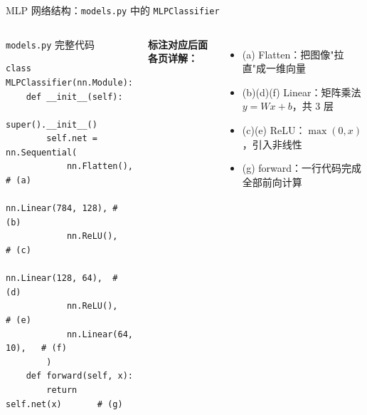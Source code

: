 \documentclass[aspectratio=169]{ctexbeamer}
\begin{document}
\begin{frame}[fragile,shrink=20]{MLP 网络结构：\texttt{models.py} 中的 \texttt{MLPClassifier}}
\begin{columns}[T]
\begin{block}{\texttt{models.py} 完整代码}
\footnotesize
\begin{lstlisting}[basicstyle=\ttfamily\scriptsize, frame=none, numbers=none, backgroundcolor=\color{codebg}]
class MLPClassifier(nn.Module):
    def __init__(self):
        super().__init__()
        self.net = nn.Sequential(
            nn.Flatten(),        # (a)
            nn.Linear(784, 128), # (b)
            nn.ReLU(),           # (c)
            nn.Linear(128, 64),  # (d)
            nn.ReLU(),           # (e)
            nn.Linear(64, 10),   # (f)
        )
    def forward(self, x):
        return self.net(x)       # (g)
\end{lstlisting}
\end{block}
\vspace{0.1cm}
\footnotesize
\textbf{标注对应后面各页详解：}
\begin{itemize}
  \item (a) Flatten：把图像"拉直"成一维向量
  \item (b)(d)(f) Linear：矩阵乘法 $y=Wx+b$，共 3 层
  \item (c)(e) ReLU：$\max(0,x)$，引入非线性
  \item (g) forward：一行代码完成全部前向计算
\end{itemize}
\end{columns}
\end{frame}
\end{document}

